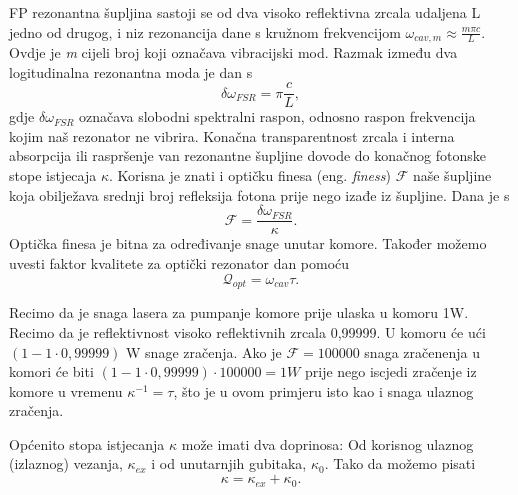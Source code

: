 FP rezonantna šupljina sastoji se od dva visoko reflektivna
zrcala udaljena L jedno od drugog, i niz rezonancija dane s kružnom frekvencijom $\omega_{cav,m} \approx \frac{m\pi c}{L}$. Ovdje je \textit{m} cijeli broj koji označava
vibracijski mod. Razmak između dva logitudinalna rezonantna moda je dan s
\begin{equation}
	\delta\omega_{FSR} = \pi \frac{c}{L},
\end{equation}
gdje $\delta \omega_{FSR}$ označava slobodni spektralni raspon, odnosno raspon frekvencija kojim naš rezonator ne vibrira. Konačna transparentnost zrcala i
interna absorpcija ili raspršenje van rezonantne šupljine dovode do konačnog fotonske stope istjecaja $\kappa$.
Korisna je znati i optičku finesa (eng. \textit{finess}) $\mathcal{F}$ naše šupljine koja obilježava srednji broj refleksija fotona prije nego izađe iz šupljine. Dana je s
\begin{equation}
	\mathcal{F} = \frac{\delta\omega_{FSR}}{\kappa}.
\end{equation}
Optička finesa je bitna za određivanje snage unutar komore. Također možemo uvesti faktor kvalitete za optički rezonator dan pomoću
\begin{equation}
	\mathcal{Q}_{opt} = \omega_{cav} \tau.
\end{equation}
\begin{Bilješka}
Recimo da je snaga lasera za pumpanje komore prije ulaska u komoru 1W. Recimo da je reflektivnost visoko reflektivnih zrcala 0,99999.
U komoru će ući $\left(1-1\cdot0,99999\right)$ W snage zračenja. Ako je $\mathcal{F}=100000$ snaga zračenenja u komori će biti
$\left(1-1\cdot0,99999\right)\cdot 100000 = 1W$ prije nego iscjedi zračenje iz komore u vremenu $\kappa^{-1} = \tau$, što je u ovom primjeru isto kao i snaga ulaznog zračenja.
\end{Bilješka}
Općenito stopa istjecanja $\kappa$ može imati dva doprinosa: Od korisnog ulaznog (izlaznog) vezanja, $\kappa_{ex}$ i od unutarnjih gubitaka, $\kappa_0$. Tako da možemo pisati
\begin{equation}
	\kappa = \kappa_{ex} + \kappa_0.
\end{equation}

